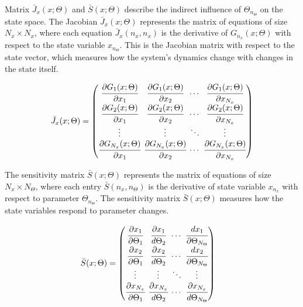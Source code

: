 \documentclass[a4paper,fleqn]{cas-dc}
\begin{document}
	Matrix ${\bar{J}_x}(x;\Theta)$ and $\bar{S}(x;\Theta)$ describe the indirect influence of $\Theta_{n_\Theta}$ on the state space. The Jacobian ${\bar{J}_x}(x;\Theta)$ represents the matrix of equations of size $N_x \times N_x$, where each equation ${\bar{J}_x}(n_x,n_x)$ is the derivative of $G_{n_x}(x;\Theta)$ with respect to the state variable $x_{n_\Theta}$. This is the Jacobian matrix with respect to the state vector, which measures how the system’s dynamics change with changes in the state itself.
	
	{\footnotesize
		\begin{align}
			\begingroup %
			\setlength\arraycolsep{2pt}
			{\bar{J}_x}(x;\Theta)=\begin{pmatrix}
				\cfrac{\partial {G_{1}}(x;\Theta)}{\partial {x_{1}}} & \cfrac{\partial {G_{1}}(x;\Theta)}{\partial {x_{2}}} & \cdots & \cfrac{\partial {G_{1}}(x;\Theta)}{\partial {x_{N_x}}}\\
				\cfrac{\partial {G_{2}}(x;\Theta)}{\partial {x_{1}}} & \cfrac{\partial {G_{2}}(x;\Theta)}{\partial {x_{2}}} & \cdots & \cfrac{\partial {G_{2}}(x;\Theta)}{\partial {x_{N_x}}}\\
				\vdots & \vdots & \ddots & \vdots\\ 
				\cfrac{\partial {G_{N_x}}(x;\Theta)}{\partial {x_{1}}} & \cfrac{\partial {G_{N_x}}(x;\Theta)}{\partial {x_{2}}} & \cdots & \cfrac{\partial {G_{N_x}}(x;\Theta)}{\partial {x_{N_x}}}\\
			\end{pmatrix}
			\endgroup
	\end{align} }
	
	The sensitivity matrix $\bar{S}(x;\Theta)$ represents the matrix of equations of size $N_x \times N_\Theta$, where each entry $\bar{S}(n_x,n_\Theta)$ is the derivative of state variable $x_{n_x}$ with respect to parameter $\Theta_{n_\Theta}$. The sensitivity matrix $\bar{S}(x;\Theta)$ measures how the state variables respond to parameter changes.
	
	{\footnotesize
		\begin{equation}
			\begin{split}
				\bar{S}(x;\Theta) & = 
				\begingroup %
				\setlength\arraycolsep{2pt}
				\begin{pmatrix}
					\cfrac{\partial {x_{1}}}{\partial {\Theta_{1}}} 	& \cfrac{\partial {x_{1}}}{d {\Theta_{2}}}     & \cdots & \cfrac{d {x_{1}}}{\partial {\Theta_{N_\Theta}}}\\
					\cfrac{\partial {x_{2}}}{\partial {\Theta_{1}}} 	& \cfrac{\partial {x_{2}}}{d {\Theta_{2}}}     & \cdots & \cfrac{d {x_{2}}}{\partial {\Theta_{N_\Theta}}}\\
					\vdots					 	    & \vdots 					   	  & \ddots & \vdots\\
					\cfrac{\partial {x_{N_x}}}{\partial {\Theta_{1}}} 	& \cfrac{\partial {x_{N_x}}}{d {\Theta_{2}}}     & \cdots & \cfrac{\partial {x_{N_x}}}{d {\Theta_{N_\Theta}}}
				\end{pmatrix} 
				\endgroup
			\end{split}
	\end{equation} }
	
\end{document}
